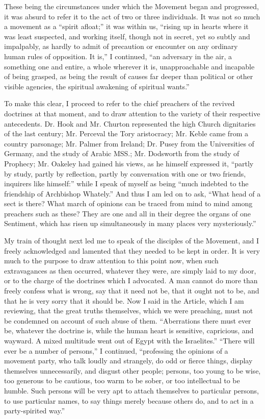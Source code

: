 These being the circumstances under which the Movement began and
progressed, it was absurd to refer it to the act of two or three
individuals. It was not so much a movement as a ``spirit afloat;'' it was within us, ``rising up in hearts where it was least
suspected, and working itself, though not in secret, yet so subtly and
impalpably, as hardly to admit of precaution or encounter on any
ordinary human rules of opposition. It is,'' I continued, ``an
adversary in the air, a something one and entire, a whole wherever it
is, unapproachable and incapable of being grasped, as being the result
of causes far deeper than political or other visible agencies, the
spiritual awakening of spiritual wants.''

To make this clear, I proceed to refer to the chief preachers of the
revived doctrines at that moment, and to draw attention to the variety
of their respective antecedents. Dr. Hook and Mr. Churton represented
the high Church dignitaries of the last century; Mr. Perceval the Tory aristocracy; Mr. Keble came from a country parsonage; Mr.
Palmer from Ireland; Dr. Pusey from the Universities of Germany,
and the study of Arabic MSS.; Mr. Dodsworth from the study of Prophecy;
Mr. Oakeley had gained his views, as he himself expressed it,
``partly by study, partly by reflection, partly by conversation with
one or two friends, inquirers like himself:'' while I speak of
myself as being ``much indebted to the friendship of Archbishop
Whately.'' And thus I am led on to ask, ``What head of a sect is
there? What march of opinions can be traced from mind to mind among
preachers such as these? They are one and all in their degree the organs
of one Sentiment, which has risen up simultaneously in many places very
mysteriously.''

My train of thought next led me to speak of the disciples of the
Movement, and I freely acknowledged and lamented that they needed to be
kept in order. It is very much to the purpose to draw attention to this
point now, when such extravagances as then occurred, whatever they were,
are simply laid to my door, or to the charge of the doctrines which I
advocated. A man cannot do more than freely confess what is wrong, say
that it need not be, that it ought not to be, and that he is very sorry
that it should be. Now I said in the Article, which I am reviewing, that
the great truths themselves, which we were preaching, must not be
condemned on account of such abuse of them. ``Aberrations there must
ever be, whatever the doctrine is, while the human heart is sensitive,
capricious, and wayward. A mixed multitude went out of Egypt with the
Israelites.'' ``There will ever be a number of persons,'' I
continued, ``professing the opinions of a movement party, who talk
loudly and strangely, do odd or fierce things, display themselves
unnecessarily, and disgust other people; persons, too young to be wise,
too generous to be cautious, too warm to be sober, or too intellectual
to be humble. Such persons will be very apt to attach themselves to
particular persons, to use particular names, to say things merely
because others do, and to act in a party-spirited way.''

